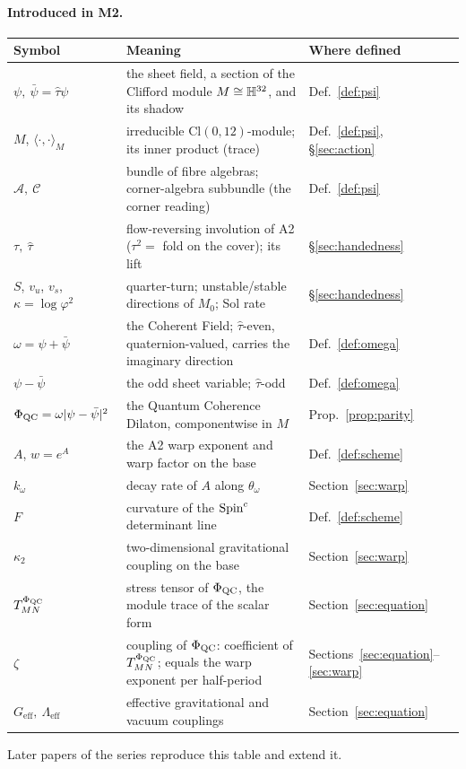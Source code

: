 \paragraph{Introduced in M2.}
\begin{center}\small
\begin{tabular}{@{}p{}p{}p{}@{}}
\toprule
Symbol & Meaning & Where defined \\
\midrule
$\psi,\ \bar\psi=\hat\tau\psi$ & the sheet field, a section of the Clifford module $M\cong\mathbb{H}^{32}$, and its shadow & Def.~\ref{def:psi} \\
$M$, $\langle\cdot,\cdot\rangle_{M}$ & irreducible $\mathrm{Cl}(0,12)$-module; its inner product (trace) & Def.~\ref{def:psi}, \S\ref{sec:action} \\
$\mathcal{A},\ \mathcal{C}$ & bundle of fibre algebras; corner-algebra subbundle (the corner reading) & Def.~\ref{def:psi} \\
$\tau,\ \hat\tau$ & flow-reversing involution of A2 ($\tau^{2}=$ fold on the cover); its lift & \S\ref{sec:handedness} \\
$S$, $v_{u}$, $v_{s}$, $\kappa=\log\varphi^{2}$ & quarter-turn; unstable/stable directions of $M_{0}$; Sol rate & \S\ref{sec:handedness} \\
$\omega=\psi+\bar\psi$ & the Coherent Field; $\hat\tau$-even, quaternion-valued, carries the imaginary direction & Def.~\ref{def:omega} \\
$\psi-\bar\psi$ & the odd sheet variable; $\hat\tau$-odd & Def.~\ref{def:omega} \\
$\Phi_{\mathrm{QC}}=\omega\lvert\psi-\bar\psi\rvert^{2}$ & the Quantum Coherence Dilaton, componentwise in $M$ & Prop.~\ref{prop:parity} \\
$A$, $w=e^{A}$ & the A2 warp exponent and warp factor on the base & Def.~\ref{def:scheme} \\
$k_{\omega}$ & decay rate of $A$ along $\theta_{\omega}$ & Section~\ref{sec:warp} \\
$F$ & curvature of the $\text{Spin}^c$ determinant line & Def.~\ref{def:scheme} \\
$\kappa_{2}$ & two-dimensional gravitational coupling on the base & Section~\ref{sec:warp} \\
$T^{\Phi_{\mathrm{QC}}}_{MN}$ & stress tensor of $\Phi_{\mathrm{QC}}$, the module trace of the scalar form & Section~\ref{sec:equation} \\
$\zeta$ & coupling of $\Phi_{\mathrm{QC}}$: coefficient of $T^{\Phi_{\mathrm{QC}}}_{MN}$; equals the warp exponent per half-period & Sections~\ref{sec:equation}--\ref{sec:warp} \\
$G_{\mathrm{eff}},\ \Lambda_{\mathrm{eff}}$ & effective gravitational and vacuum couplings & Section~\ref{sec:equation} \\
\bottomrule
\end{tabular}
\end{center}
Later papers of the series reproduce this table and extend it.
